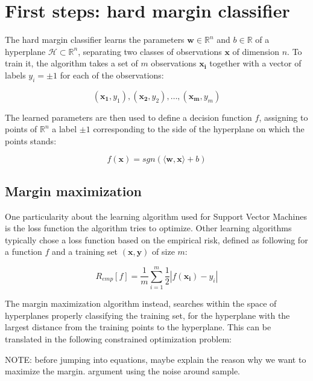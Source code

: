 
\section {First steps: hard margin classifier}

The hard margin classifier learns the parameters $\mathbf{w} \in \mathbb{R}^n$ and $b \in \mathbb{R}$ of a hyperplane $\mathscr{H} \subset \mathbb{R}^n$, separating two classes of observations $\mathbf{x}$ of dimension $n$. To train it, the algorithm takes a set of $m$ observations $\mathbf{x_i}$ together with a vector of labels $y_i = \pm 1$ for each of the observations:

$$
(\mathbf{x_1}, y_1), (\mathbf{x_2}, y_2), \dotsc, (\mathbf{x_m}, y_m)
$$

The learned parameters are then used to define a decision function $f$, assigning to points of $\mathbb{R}^n$ a label $\pm 1$ corresponding to the side of the hyperplane on which the points stands:

\begin{equation}
  f(\mathbf{x}) = sgn(\langle\mathbf{w}, \mathbf{x}\rangle + b)
\end{equation}

\subsection {Margin maximization}

One particularity about the learning algorithm used for Support Vector Machines is the loss function the algorithm tries to optimize. Other learning algorithms typically chose a loss function based on the empirical risk, defined as following for a function $f$ and a training set $(\mathbf{x}, \mathbf{y})$ of size $m$:

\begin{equation}
  R_{emp}[f] = \frac{1}{m}\sum^m_{i=1}\frac{1}{2}|f(\mathbf{x_i}) - y_i|
\end{equation}

The margin maximization algorithm instead, searches within the space of hyperplanes properly classifying the training set, for the hyperplane with the largest distance from the training points to the hyperplane. This can be translated in the following constrained optimization problem:

\textcolor[rgb]{1,0,0}{
NOTE: before jumping into equations, maybe explain the reason why we want to maximize the margin. argument using the noise around sample.
}

